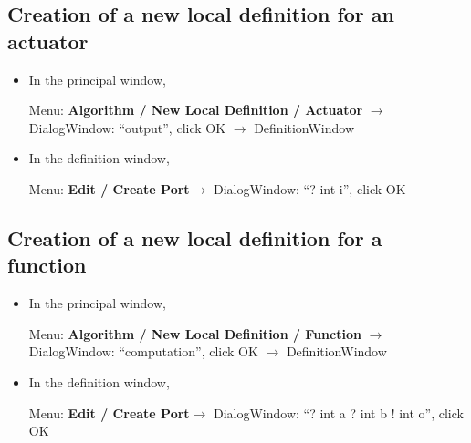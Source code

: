 \documentclass[a4paper,twoside]{report}
\begin{document}
\subsection{Creation of a new local definition for an actuator}
\begin{itemize}
\item In the principal window, 

Menu: \textbf{Algorithm / New Local Definition / Actuator} $\rightarrow$
DialogWindow: ``output'', click OK $\rightarrow$ DefinitionWindow

\item In the definition window,

Menu: \textbf{Edit / Create Port}$\rightarrow$ DialogWindow: ``? int i'', click
OK

\end{itemize}

\subsection{Creation of a new local definition for a function}
\begin{itemize}
\item In the principal window, 

Menu: \textbf{Algorithm / New Local Definition / Function} $\rightarrow$
DialogWindow: ``computation'', click OK $\rightarrow$ DefinitionWindow

\item In the definition window,

Menu: \textbf{Edit / Create Port}$\rightarrow$ DialogWindow: ``? int a ?  int b
! int o'', click OK

\end{itemize}
\end{document}
